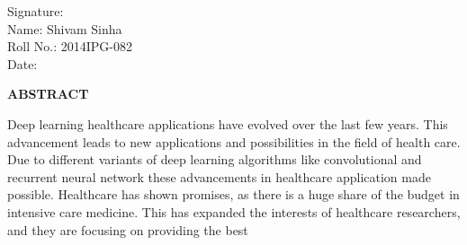 \documentclass[12pt,a4paper]{article}
\begin{document}
\noindent Signature:\vspace{1cm}\\
Name: Shivam Sinha\\
Roll No.: 2014IPG-082\\
Date: \\
\clearpage
\begin{center}
{\large \bf ABSTRACT}
\end{center}
Deep learning healthcare applications have evolved over the last few years. This advancement leads to new applications and possibilities in the field of health care. Due to different variants of deep learning algorithms like convolutional and recurrent neural network these advancements in healthcare application made possible. Healthcare has shown promises, as there is a huge share of the budget in intensive care medicine. This has expanded the interests of healthcare researchers, and they are focusing on providing the best
\end{document}
